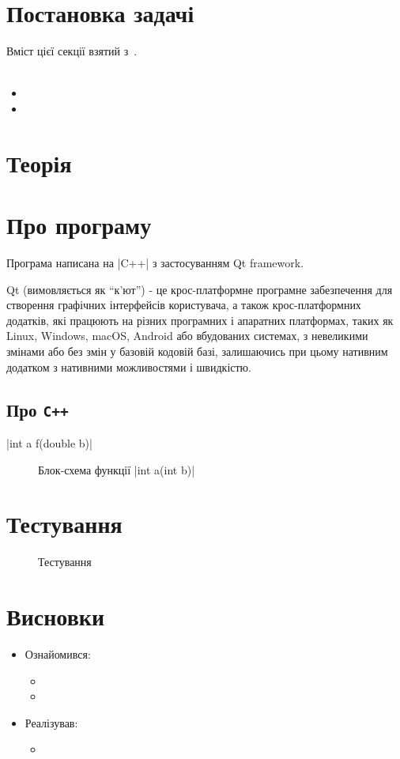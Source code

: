 \documentclass[../../../../document]{subfiles}
\begin{document}
	\chapter{Постановка задачі}
	Вміст цієї секції взятий з~\cite{computational_methods}.\\
	\\
	\begin{itemize}
		\item
		\item
	\end{itemize}

	\chapter{Теорія}
	\chapter{Про програму}
	Програма написана на \textinline|C++| з застосуванням Qt framework.

	Qt (вимовляється як \enquote{к'ют}) - це крос-платформне
	програмне забезпечення для створення графічних інтерфейсів користувача, а також
	крос-платформних додатків, які працюють на різних програмних і апаратних
	платформах, таких як Linux, Windows, macOS, Android або вбудованих системах, з
	невеликими змінами або без змін у базовій кодовій базі, залишаючись при цьому
	нативним додатком з нативними можливостями і швидкістю.
	\section{Про \texttt{C++}}
	\begin{funcDescription}
		|int a f(double b)|
		
	\end{funcDescription}
	


	\begin{figure}[htb]
		\centering
		\caption{Блок-схема функції \cppinline|int a(int b)|}%
		\label{fig:blockdiagram}%
	\end{figure}

	\chapter{Тестування}
	\begin{figure}[htb]
		\centering
		\caption{Тестування}%
		\label{fig:tag}
	\end{figure}

	\chapter{Висновки}
	\begin{itemize}
		\item Ознайомився:
			\begin{itemize}
				\item
				\item
			\end{itemize}
		\item Реалізував:
			\begin{itemize}
				\item
			\end{itemize}
	\end{itemize}
\end{document}
